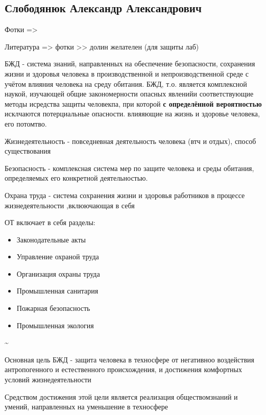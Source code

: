 \documentclass[a4paper,12pt]{report}
\begin{document}
	\def \nocredits {}
	\def \LineE {Конспект по дисциплине}
	\def \LineF {Безопасность жизнедеятельности}

	\maketitle


\subsection*{Слободянюк Александр Александрович}

Фотки =>

Литература => фотки >> долин желателен (для защиты лаб)

	БЖД - система знаний, направленных на обеспечение безопасности, сохранения жизни и здоровья человека в производственной и непроизводственной среде с учётом влияния человека на среду обитания.
	БЖД, т.о. является комплексной наукой, изучающей общие закономерности опасных явленийи соответствующие методы исредства защиты человекпа, при которой \textbf{с определённой вероятностью} исклчаются потерциальные опасности. влияяющие на жизнь и здоровье человека, его потомтво.
	
	Жизнедеятельность - повседневная деятельность человека (втч и отдых), способ существования
	
	
	Безопасность - комплексная система мер по защите человека  и среды обитания, определяемых его конкретной деятельностью.
	
	Охрана труда - система сохранения жизни и здоровья работников в процессе жизнедеятельности ,вклюючающая в себя
	
	
	ОТ включает в себя разделы:
	\begin{itemize}
	\item	Законодательные акты
	\item	Управление охраной труда
	\item	Организация охраны труда
	\item	Промышленная санитария
	\item	Пожарная безопасность
	\item	Промышленная экология
	\end{itemize}
	\sim
	
	Основная цель БЖД - защита человека в техносфере от негативноо воздействия антропогенного и естественного происхождения, и достижения комфортных условий жизнедеятельности
	
	Средством достижения этой цели является реализация обществомзнаний и умений, направленных на уменьшение в техносфере 
	
\end{document}
